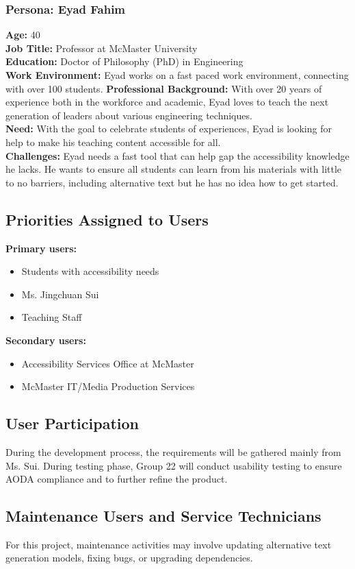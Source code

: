 \documentclass[12pt]{article}
\begin{document}
\subsubsection*{Persona: Eyad Fahim}
\textbf{Age:} 40 \\
\textbf{Job Title:} Professor at McMaster University\\
\textbf{Education:} Doctor of Philosophy (PhD) in Engineering\\
\textbf{Work Environment:} Eyad works on a fast paced work
environment, connecting with over 100 students.
\textbf{Professional Background:} With over 20 years of experience both in
the workforce and academic, Eyad loves to teach the next generation
of leaders about various engineering techniques.\\[2mm]
\textbf{Need:} With the goal to
celebrate students of experiences, Eyad is looking for help to make
his teaching content accessible for all.\\
\textbf{Challenges:} Eyad needs a fast tool that can help gap the
accessibility knowledge he lacks. He wants to ensure all students can
learn from his materials with little to no barriers, including
alternative text but he has no idea how to get started.
\subsection{Priorities Assigned to Users}
\textbf{Primary users:}
\begin{itemize}
  \item Students with accessibility needs
  \item Ms. Jingchuan Sui
  \item Teaching Staff
\end{itemize}
\textbf{Secondary users:}
\begin{itemize}
  \item Accessibility Services Office at McMaster
  \item McMaster IT/Media Production Services
\end{itemize}
\subsection{User Participation}
During the development process, the requirements will be gathered
mainly from Ms. Sui. During testing phase, Group 22 will conduct
usability testing to ensure AODA compliance and to further refine the product.
\subsection{Maintenance Users and Service Technicians}
For this project, maintenance activities may involve updating
alternative text generation models, fixing bugs, or upgrading dependencies.
\end{document}
